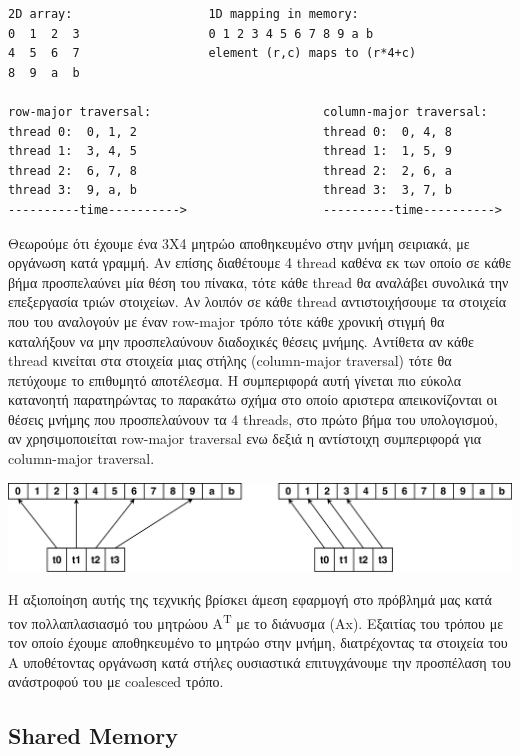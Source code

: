 \begin{verbatim}
2D array:                   1D mapping in memory:
0  1  2  3                  0 1 2 3 4 5 6 7 8 9 a b
4  5  6  7                  element (r,c) maps to (r*4+c)
8  9  a  b

row-major traversal:                        column-major traversal:
thread 0:  0, 1, 2                          thread 0:  0, 4, 8
thread 1:  3, 4, 5                          thread 1:  1, 5, 9
thread 2:  6, 7, 8                          thread 2:  2, 6, a
thread 3:  9, a, b                          thread 3:  3, 7, b
----------time---------->                   ----------time---------->
\end{verbatim}

Θεωρούμε ότι έχουμε ένα 3Χ4 μητρώο αποθηκευμένο στην μνήμη σειριακά, με οργάνωση κατά γραμμή. Αν επίσης διαθέτουμε 4 thread καθένα εκ των οποίο σε κάθε βήμα προσπελαύνει μία θέση του πίνακα, τότε κάθε thread θα αναλάβει συνολικά την επεξεργασία τριών στοιχείων. Αν λοιπόν σε κάθε thread αντιστοιχήσουμε τα στοιχεία που του αναλογούν με έναν row-major τρόπο τότε κάθε χρονική στιγμή θα καταλήξουν να μην προσπελαύνουν διαδοχικές θέσεις μνήμης. Αντίθετα αν κάθε thread κινείται στα στοιχεία μιας στήλης (column-major traversal) τότε θα πετύχουμε το επιθυμητό αποτέλεσμα. Η συμπεριφορά αυτή γίνεται πιο εύκολα κατανοητή παρατηρώντας το παρακάτω σχήμα στο οποίο αριστερα απεικονίζονται οι θέσεις μνήμης που προσπελαύνουν τα 4 threads, στο πρώτο βήμα του υπολογισμού, αν χρησιμοποιείται row-major traversal ενω δεξιά η αντίστοιχη συμπεριφορά για column-major traversal.

    \includegraphics[scale=0.45]{./figures/2_tnv/coal.pdf}

Η αξιοποίηση αυτής της τεχνικής βρίσκει άμεση εφαρμογή στο πρόβλημά μας κατά τον πολλαπλασιασμό του μητρώου A\textsuperscript{T} με το διάνυσμα (Ax). Εξαιτίας του τρόπου με τον οποίο έχουμε αποθηκευμένο το μητρώο στην μνήμη, διατρέχοντας τα στοιχεία του Α υποθέτοντας οργάνωση κατά στήλες ουσιαστικά επιτυγχάνουμε την προσπέλαση του ανάστροφού του με coalesced τρόπο. 

\subsection*{Shared Memory}

